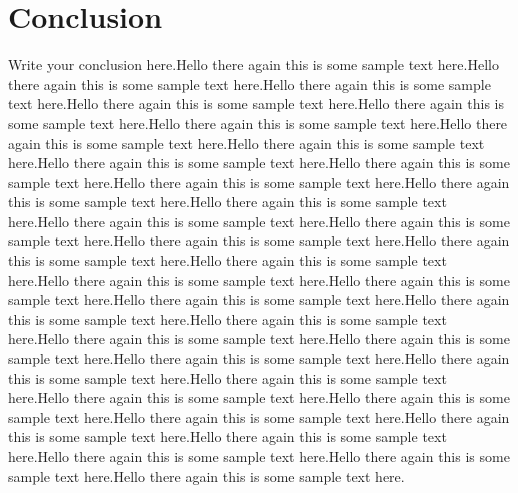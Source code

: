 \documentclass{article}
\begin{document}
\section{Conclusion}
Write your conclusion here.Hello there again this is some sample text here.Hello there again this is some sample text here.Hello there again this is some sample text here.Hello there again this is some sample text here.Hello there again this is some sample text here.Hello there again this is some sample text here.Hello there again this is some sample text here.Hello there again this is some sample text here.Hello there again this is some sample text here.Hello there again this is some sample text here.Hello there again this is some sample text here.Hello there again this is some sample text here.Hello there again this is some sample text here.Hello there again this is some sample text here.Hello there again this is some sample text here.Hello there again this is some sample text here.Hello there again this is some sample text here.Hello there again this is some sample text here.Hello there again this is some sample text here.Hello there again this is some sample text here.Hello there again this is some sample text here.Hello there again this is some sample text here.Hello there again this is some sample text here.Hello there again this is some sample text here.Hello there again this is some sample text here.Hello there again this is some sample text here.Hello there again this is some sample text here.Hello there again this is some sample text here.Hello there again this is some sample text here.Hello there again this is some sample text here.Hello there again this is some sample text here.Hello there again this is some sample text here.Hello there again this is some sample text here.Hello there again this is some sample text here.Hello there again this is some sample text here.Hello there again this is some sample text here.
\end{document}
